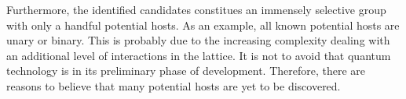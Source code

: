 Furthermore, the identified candidates constitues an immensely selective group with only a handful potential hosts. As an example, all known potential hosts are unary or binary. This is probably due to the increasing complexity dealing with an additional level of interactions in the lattice. It is not to avoid that quantum technology is in its preliminary phase of development. Therefore, there are reasons to believe that many potential hosts are yet to be discovered. 




\newpage
